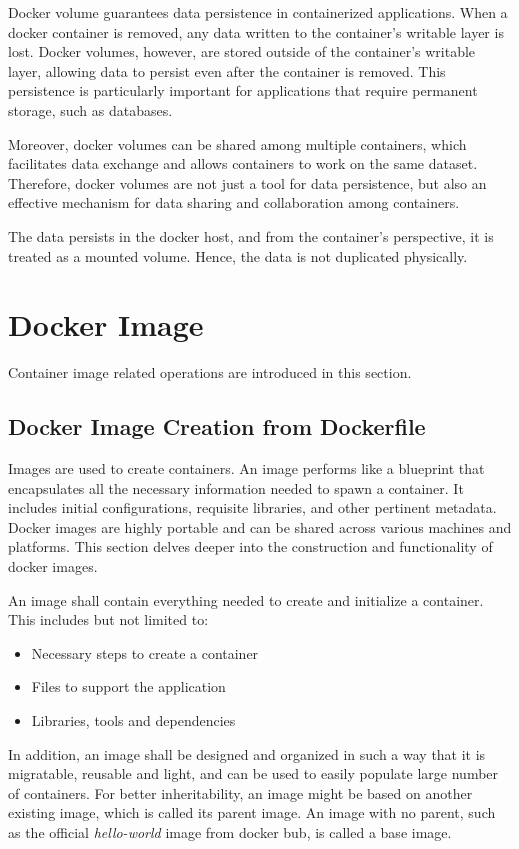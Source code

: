 Docker volume guarantees data persistence in containerized applications. When a docker container is removed, any data written to the container's writable layer is lost. Docker volumes, however, are stored outside of the container's writable layer, allowing data to persist even after the container is removed. This persistence is particularly important for applications that require permanent storage, such as databases.

Moreover, docker volumes can be shared among multiple containers, which facilitates data exchange and allows containers to work on the same dataset. Therefore, docker volumes are not just a tool for data persistence, but also an effective mechanism for data sharing and collaboration among containers.

The data persists in the docker host, and from the container's perspective, it is treated as a mounted volume. Hence, the data is not duplicated physically.


\section{Docker Image} \label{ch:vac:sec:di}

Container image related operations are introduced in this section.

\subsection{Docker Image Creation from Dockerfile}

Images are used to create containers. An image performs like a blueprint that encapsulates all the necessary information needed to spawn a container. It includes initial configurations, requisite libraries, and other pertinent metadata. Docker images are highly portable and can be shared across various machines and platforms. This section delves deeper into the construction and functionality of docker images.

An image shall contain everything needed to create and initialize a container. This includes but not limited to:
\begin{itemize}
  \item Necessary steps to create a container
  \item Files to support the application
  \item Libraries, tools and dependencies
\end{itemize}
In addition, an image shall be designed and organized in such a way that it is migratable, reusable and light, and can be used to easily populate large number of containers. For better inheritability, an image might be based on another existing image, which is called its parent image. An image with no parent, such as the official \textit{hello-world} image from docker bub, is called a base image.


